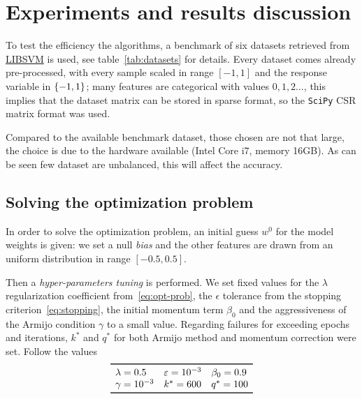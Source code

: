 
\cleardoublepage
\section{Experiments and results discussion}\label{sc:exp}

To test the efficiency the algorithms, a benchmark of six datasets retrieved from \href{https://www.csie.ntu.edu.tw/~cjlin/libsvmtools/datasets/}{LIBSVM} is used, see table~\vref{tab:datasets} for details. Every dataset comes already pre-processed, with every sample scaled in range $[-1,1]$ and the response variable in $\{-1,1\}$; many features are categorical with values $0,1,2\dots$, this implies that the dataset matrix can be stored in sparse format, so the \texttt{SciPy} CSR matrix format was used.

Compared to the available benchmark dataset, those chosen are not that large, the choice is due to the hardware available (Intel\textregistered\xspace Core\texttrademark\xspace i\num{7}, memory \mbox{\num{16}GB}). As can be seen few dataset are unbalanced, this will affect the accuracy.%

\subsection{Solving the optimization problem}

In order to solve the optimization problem, an initial guess $w^0$ for the model weights is given: we set a null \emph{bias} and the other features are drawn from an uniform distribution in range $[-0.5,0.5]$.

Then a \emph{hyper-parameters tuning} is performed. We set fixed values for the $\lambda$ regularization coefficient from~\eqref{eq:opt-prob}, the $\epsilon$ tolerance from the stopping criterion~\eqref{eq:stopping}, the initial momentum term $\beta_0$ and the aggressiveness of the Armijo condition $\gamma$ to a small value. Regarding failures for exceeding epochs and iterations, $k^\ast$ and $q^\ast$ for both Armijo method and momentum correction were set. Follow the values
\[
\begin{array}{lll}
\toprule
\lambda=0.5 & \epsilon=\num{e-3} & \beta_0=0.9 \\
\gamma=\num{e-3} & k^\ast=600 & q^\ast=100 \\
\bottomrule
\end{array}
\]


